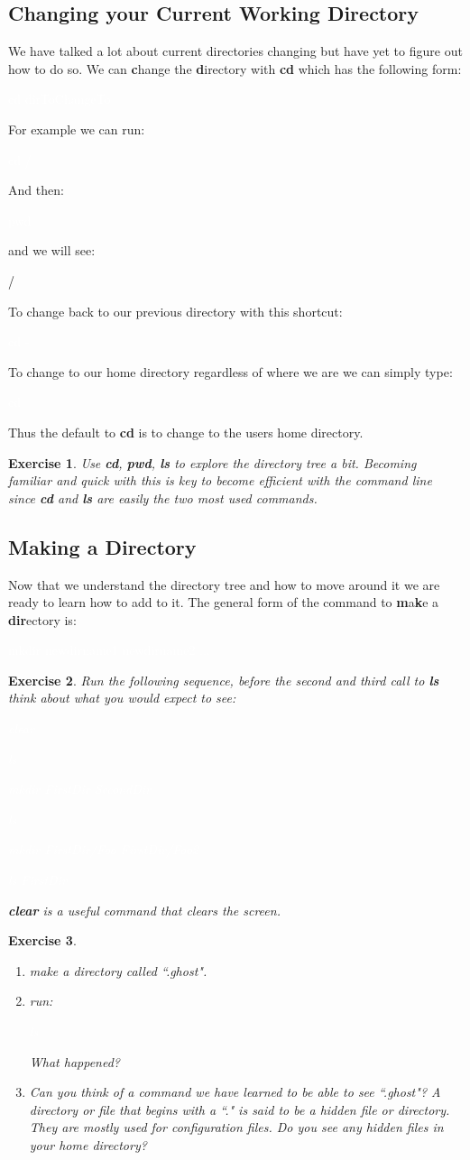 \documentclass{book}
\newcommand{\commandline}[1]{\begin{center} \colorbox{Dark}{\textcolor{white}{#1}} \end{center}}
\newcommand{\exampleout}[1]{\begin{center} \colorbox{Light}{\textcolor{black}{#1}} \end{center}}
\newtheorem{ex}{Exercise}[chapter]
\begin{document}
\subsection{Changing your Current Working Directory}
We have talked a lot about current directories changing but have yet to figure out how to do so. We can \textbf{c}hange the \textbf{d}irectory with \textbf{cd} which has the following form:
\commandline{cd dirToChangeTo}
For example we can run:
\commandline{cd /}
And then:
\commandline{pwd}
and we will see:
\exampleout{/}
To change back to our previous directory with this shortcut:
\commandline{cd -}
To change to our home directory regardless of where we are we can simply type:
\commandline{cd}
Thus the default to \textbf{cd} is to change to the users home directory. \\
\begin{ex}
	Use \textbf{cd}, \textbf{pwd}, \textbf{ls} to explore the directory tree a bit. Becoming familiar and quick with this is key to become efficient with the command line since \textbf{cd} and \textbf{ls} are easily the two most used commands.
\end{ex}

\subsection{Making a Directory}
Now that we understand the directory tree and how to move around it we are ready to learn how to add to it. The general form of the command to \textbf{m}a\textbf{k}e a \textbf{dir}ectory is:
\commandline{mkdir newdirname1 newdirname2 ...}
\begin{ex}
	Run the following sequence, before the second and third call to \textbf{ls} think about what you would expect to see:
\commandline{clear}
\commandline{ls}
\commandline{mkdir FirstDir SecondDir}
\commandline{ls}
\commandline{mkdir FirstDir/Foo FirstDir/Foo2}
\commandline{ls FirstDir}
\textbf{clear} is a useful command that clears the screen.
\end{ex}
\begin{ex}
	\begin{enumerate}
			\item make a directory called ``.ghost".
			\item run:
				\commandline{ls}
				What happened?
			\item Can you think of a command we have learned to be able to see ``.ghost"? A directory or file that begins with a ``." is said to be a hidden file or directory. They are mostly used for configuration files. Do you see any hidden files in your home directory?
	\end{enumerate}
\end{ex}
\end{document}
